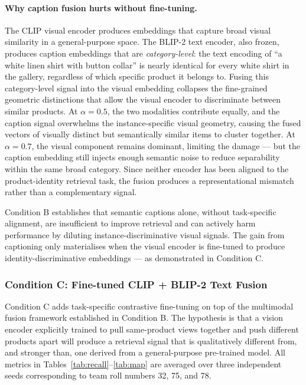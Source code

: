 \documentclass[12pt,a4paper]{article}
\begin{document}
\paragraph{Why caption fusion hurts without fine-tuning.}
The CLIP visual encoder produces embeddings that capture broad visual similarity
in a general-purpose space. The BLIP-2 text encoder, also frozen, produces
caption embeddings that are \emph{category-level}: the text encoding of
``a white linen shirt with button collar'' is nearly identical for every white
shirt in the gallery, regardless of which specific product it belongs to.
Fusing this category-level signal into the visual embedding collapses the
fine-grained geometric distinctions that allow the visual encoder to
discriminate between similar products. At $\alpha{=}0.5$, the two modalities
contribute equally, and the caption signal overwhelms the instance-specific
visual geometry, causing the fused vectors of visually distinct but
semantically similar items to cluster together. At $\alpha{=}0.7$, the visual
component remains dominant, limiting the damage — but the caption embedding
still injects enough semantic noise to reduce separability within the same
broad category. Since neither encoder has been aligned to the product-identity
retrieval task, the fusion produces a representational mismatch rather than a
complementary signal.


Condition B establishes that semantic captions alone, without task-specific
alignment, are insufficient to improve retrieval and can actively harm
performance by diluting instance-discriminative visual signals. The gain from
captioning only materialises when the visual encoder is fine-tuned to produce
identity-discriminative embeddings — as demonstrated in Condition C.

\subsubsection{Condition C: Fine-tuned CLIP + BLIP-2 Text Fusion}

Condition C adds task-specific contrastive fine-tuning on top of the
multimodal fusion framework established in Condition B.
The hypothesis is that a vision encoder explicitly trained to pull
same-product views together and push different products apart will
produce a retrieval signal that is qualitatively different from, and
stronger than, one derived from a general-purpose pre-trained model.
All metrics in Tables~\ref{tab:recall}--\ref{tab:map} are averaged over
three independent seeds corresponding to team roll numbers 32, 75, and 78.
\end{document}
